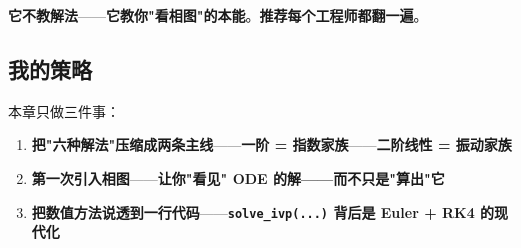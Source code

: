 \textbf{它不教解法}——\textbf{它教你"看相图"的本能}。\textbf{推荐每个工程师都翻一遍}。

\subsection{我的策略}

本章只做三件事：

\begin{enumerate}
\item \textbf{把"六种解法"压缩成两条主线}——\textbf{一阶 = 指数家族}——\textbf{二阶线性 = 振动家族}
\item \textbf{第一次引入相图}——\textbf{让你"看见" ODE 的解——而不只是"算出"它}
\item \textbf{把数值方法说透到一行代码}——\textbf{\texttt{solve\_ivp(...)} 背后是 Euler + RK4 的现代化}
\end{enumerate}

